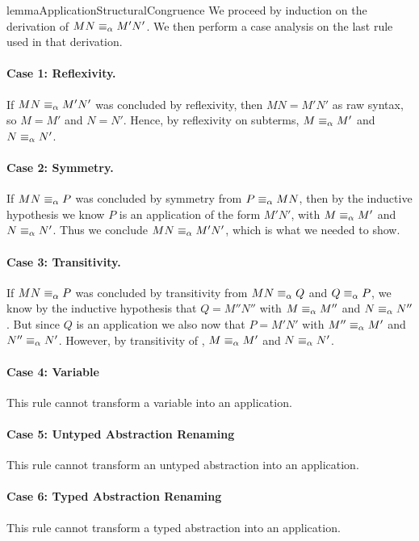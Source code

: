 \begin{longproof}{lemmaApplicationStructuralCongruence}
We proceed by induction on the derivation of $MN \equiv_\alpha M'N'$.
We then perform a case analysis on the last rule used in that derivation.

\paragraph{Case 1: Reflexivity.}
If $MN \equiv_\alpha M'N'$ was concluded by reflexivity, then $MN = M'N'$ 
as raw syntax, so $M = M'$ and $N = N'$. Hence, by reflexivity on subterms, 
$M \equiv_\alpha M'$ and $N \equiv_\alpha N'$.

\paragraph{Case 2: Symmetry.}
If $MN \equiv_\alpha P$ was concluded by symmetry from $P \equiv_\alpha MN$, then by the inductive hypothesis we know $P$ is an application of the form $M'N'$, with $M \equiv_\alpha M'$ and $N \equiv_\alpha N'$. Thus we conclude $MN \equiv_\alpha M'N'$, which is what we needed to show.

\paragraph{Case 3: Transitivity.}
If $MN \equiv_\alpha P$ was concluded by transitivity from $MN \equiv_\alpha Q$ and $Q \equiv_\alpha P$, we know by the inductive hypothesis that $Q=M''N''$ with $M \equiv_\alpha M''$ and $N \equiv_\alpha N''$. But since $Q$ is an application we also now that $P=M'N'$ with $M'' \equiv_\alpha M'$ and $N'' \equiv_\alpha N'$. However, by transitivity of \alphaequivalence, $M \equiv_\alpha M'$ and $N \equiv_\alpha N'$.

\paragraph{Case 4: Variable}
This rule cannot transform a variable into an application.

\paragraph{Case 5: Untyped Abstraction Renaming}
This rule cannot transform an untyped abstraction into an application.

\paragraph{Case 6: Typed Abstraction Renaming}
This rule cannot transform a typed abstraction into an application.


\end{longproof}
